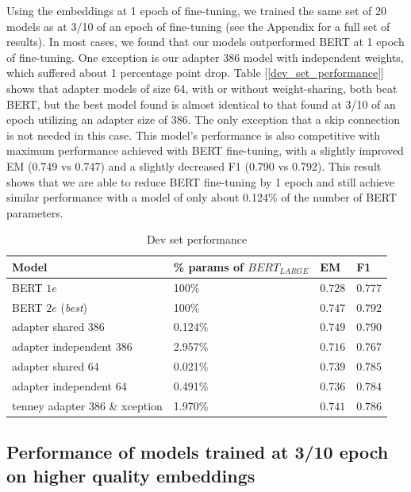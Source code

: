 Using the embeddings at 1 epoch of fine-tuning, we trained the same set of 20 models as at 3/10 of an epoch of fine-tuning (see the Appendix for a full set of results). In most cases, we found that our models outperformed BERT at 1 epoch of fine-tuning. One exception is our adapter 386 model with independent weights, which suffered about 1 percentage point drop. Table [\ref{dev_set_performance}] shows that adapter models of size 64, with or without weight-sharing, both beat BERT, but the best model found is almost identical to that found at 3/10 of an epoch utilizing an adapter size of 386. The only exception that a skip connection is not needed in this case. This model’s performance is also competitive with maximum performance achieved with BERT fine-tuning, with a slightly improved EM (0.749 vs 0.747) and a slightly decreased F1 (0.790 vs 0.792). This result shows that we are able to reduce BERT fine-tuning by 1 epoch and still achieve similar performance with a model of only about 0.124\% of the number of BERT parameters. 

\begin{table}[ht]
	\centering
	\small
	\begin{tabular}{L{2.8cm} L{1.8cm} C{0.6cm} C{0.6cm}}
		\hline
		\textbf{Model} & \textbf{\% params of} $BERT_{LARGE}$ & \textbf{EM} & \textbf{F1}\Tstrut \\
		\hline
		BERT $1e$ & 100\% 						 & $0.728$ & $0.777$ \\
		BERT $2e$ (\textit{best}) & 100\%		 & $0.747$ & $0.792$ \\
		adapter shared 386 & 0.124\% 			 & $0.749$ & $0.790$ \\
		\hline\hline
		adapter independent 386 & 2.957\% 		 & \boldmath$0.716$ & \boldmath$0.767$ \\
		\hline\hline
		adapter shared 64 & 0.021\% 			 & $0.739$ & $0.785$ \\
		adapter independent 64 & 0.491\% 		 & $0.736$ & $0.784$ \\
		tenney adapter 386 \& xception & 1.970\% & $0.741$ & $0.786$ \\
		\hline
	\end{tabular}
	\caption{\label{tbl:dev_set_performance}Dev set performance}
\end{table}

\subsection{Performance of models trained at 3/10 epoch on higher quality embeddings}

